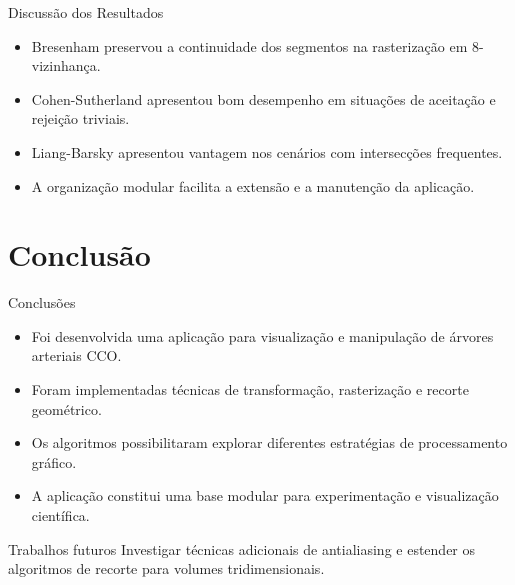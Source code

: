 \documentclass[aspectratio=169,11pt]{beamer}
\begin{document}
\begin{frame}{Discussão dos Resultados}
\begin{itemize}
    \item Bresenham preservou a continuidade dos segmentos
    na rasterização em 8-vizinhança.
    
    \vspace{0.15cm}
    \item Cohen-Sutherland apresentou bom desempenho
    em situações de aceitação e rejeição triviais.
    
    \vspace{0.15cm}
    \item Liang-Barsky apresentou vantagem nos cenários
    com intersecções frequentes.
    
    \vspace{0.15cm}
    \item A organização modular facilita a extensão
    e a manutenção da aplicação.
\end{itemize}
\end{frame}

\section{Conclusão}

\begin{frame}{Conclusões}
\begin{itemize}
    \item Foi desenvolvida uma aplicação para visualização
    e manipulação de árvores arteriais CCO.
    
    \vspace{0.2cm}
    \item Foram implementadas técnicas de transformação,
    rasterização e recorte geométrico.
    
    \vspace{0.2cm}
    \item Os algoritmos possibilitaram explorar diferentes
    estratégias de processamento gráfico.
    
    \vspace{0.2cm}
    \item A aplicação constitui uma base modular para
    experimentação e visualização científica.
\end{itemize}

\vspace{0.3cm}

\begin{block}{Trabalhos futuros}
Investigar técnicas adicionais de antialiasing e estender
os algoritmos de recorte para volumes tridimensionais.
\end{block}
\end{frame}
\end{document}
